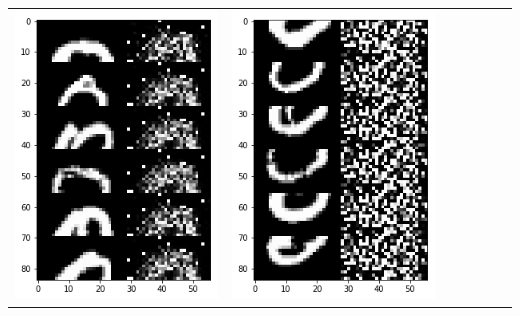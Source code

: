 \documentclass[12pt]{report} %
\begin{document}
\begin{tabular}{m{0.7cm}m{2.4cm}m{2.4cm}m{2.4cm}m{2.4cm}m{2.4cm}m{2.4cm}}
\includegraphics[scale=0.3]{pictures/M2_0_up.png} & \includegraphics[scale=0.3]{pictures/M2_0_down.png}\\

\end{tabular}
\end{document}
